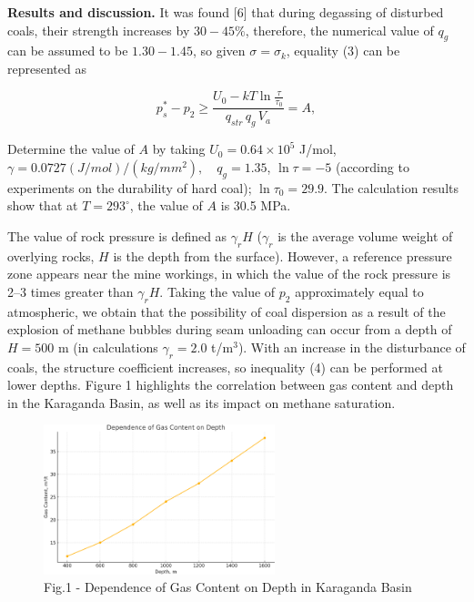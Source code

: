 \begin{multicols}{2}
{\bfseries Results and discussion.} It was found [6] that during
degassing of disturbed coals, their strength increases by $30-45\%$,
therefore, the numerical value of $q_g$ can be assumed to be
$1.30-1.45$, so given $\sigma = \sigma_k$, equality (3) can be
represented as

\begin{equation}
p_s^* - p_2 \geq \frac{U_0 - kT \ln \frac{\tau}{\tau_0}}{q_{str} \, q_{g} \, V_a} = A,
\end{equation}

Determine the value of $A$ by taking $U_0 = 0.64 \times 10^5$ J/mol,
$\gamma = 0.0727(J/mol)/(kg/mm^2),\quad q_g = 1.35$, $\ln \tau = -5$
(according to experiments on the durability of hard coal); $\ln \tau_0
= 29.9$. The calculation results show that at $T = 293^\circ$, the
value of $A$ is 30.5 MPa.

The value of rock pressure is defined as $\gamma_r H$ ($\gamma_r$ is
the average volume weight of overlying rocks, $H$ is the depth from
the surface). However, a reference pressure zone appears near the mine
workings, in which the value of the rock pressure is 2–3 times greater
than $\gamma_r H$. Taking the value of $p_2$ approximately equal to
atmospheric, we obtain that the possibility of coal dispersion as a
result of the explosion of methane bubbles during seam unloading can
occur from a depth of $H = 500$ m (in calculations $\gamma_r = 2.0$
t/m$^3$). With an increase in the disturbance of coals, the structure
coefficient increases, so inequality (4) can be performed at lower
depths. Figure 1 highlights the correlation between gas content and
depth in the Karaganda Basin, as well as its impact on methane
saturation.
\end{multicols}

\begin{figure}[H]
	\centering
	\includegraphics[width=0.6\textwidth]{media/gorn2/image52}
	\caption*{Fig.1 - Dependence of Gas Content on Depth in Karaganda Basin}
\end{figure}

